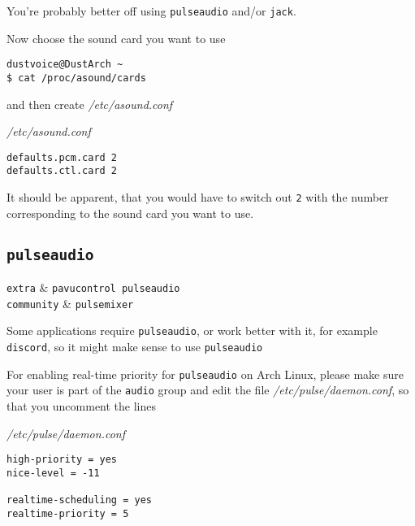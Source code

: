\documentclass[10pt]{dustdoc}
\begin{document}
\begin{NOTE}
    You’re probably better off using \texttt{pulseaudio} and/or \texttt{jack}.
\end{NOTE}

Now choose the sound card you want to use

\begin{verbatim}
dustvoice@DustArch ~
$ cat /proc/asound/cards
\end{verbatim}

\noindent
and then create \textit{/etc/asound.conf}

\begin{mintedlisting}
    \caption*{\textit{/etc/asound.conf}}
    \begin{verbatim}
defaults.pcm.card 2
defaults.ctl.card 2
    \end{verbatim}
\end{mintedlisting}

\begin{NOTE}
    It should be apparent, that you would have to switch out \texttt{2} with the number corresponding to the sound card you want to use.
\end{NOTE}

\subsection{\texttt{pulseaudio}}
\label{sec:pulseaudio}

\begin{packagetable}
    \texttt{extra} & \texttt{pavucontrol pulseaudio} \\ 
    \texttt{community} & \texttt{pulsemixer} \\ 
\end{packagetable}

Some applications require \texttt{pulseaudio}, or work better with it, for example \texttt{discord}, so it might make sense to use \texttt{pulseaudio}

For enabling real-time priority for \texttt{pulseaudio} on Arch Linux, please make sure your user is part of the \texttt{audio} group and edit the file \textit{/etc/pulse/daemon.conf}, so that you uncomment the lines

\begin{mintedlisting}
    \caption*{\textit{/etc/pulse/daemon.conf}}
    \begin{verbatim}
high-priority = yes
nice-level = -11

realtime-scheduling = yes
realtime-priority = 5
    \end{verbatim}
\end{mintedlisting}
\end{document}
